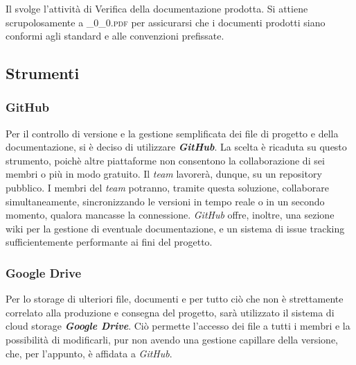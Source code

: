 		\subsubsection{\Ver}
		Il \textit{\Ver} svolge l'attività di Verifica della documentazione prodotta. Si attiene scrupolosamente a \textsc{\_0\_0.pdf} per assicurarsi che i documenti prodotti siano conformi agli standard e alle convenzioni prefissate.

	\subsection{Strumenti}

		\subsubsection{GitHub}
		Per il controllo di versione e la gestione semplificata dei file di progetto e della documentazione, si è deciso di utilizzare \textbf{\textit{GitHub}}. La scelta è ricaduta su questo strumento, poichè altre piattaforme non consentono la collaborazione di sei membri o più in modo gratuito. Il \textit{team} lavorerà, dunque, su un repository pubblico. I membri del \textit{team} potranno, tramite questa soluzione, collaborare simultaneamente, sincronizzando le versioni in tempo reale o in un secondo momento, qualora mancasse la connessione. \textit{GitHub} offre, inoltre, una sezione wiki per la gestione di eventuale documentazione, e un sistema di issue tracking sufficientemente performante ai fini del progetto.

		\subsubsection{Google Drive}
		Per lo storage di ulteriori file, documenti e per tutto ciò che non è strettamente correlato alla produzione e consegna del progetto, sarà utilizzato il sistema di cloud storage \textbf{\textit{Google Drive}}. Ciò permette l'accesso dei file a tutti i membri e la possibilità di modificarli, pur non avendo una gestione capillare della versione, che, per l'appunto, è affidata a \textit{GitHub}.

